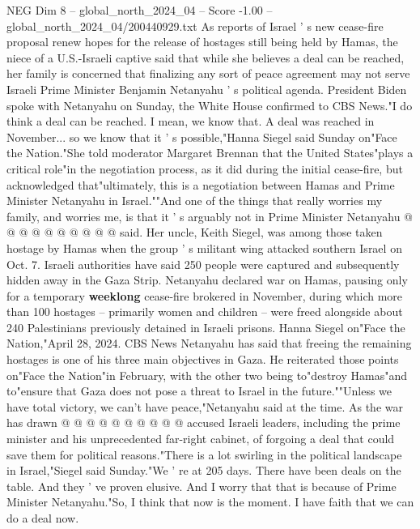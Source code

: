 \begin{textsample}{NEG Dim 8 – global\_north\_2024\_04 – Score -1.00 – global\_north\_2024\_04/200440929.txt}  \label{ex:f8_neg_134}
As reports of Israel ' s new cease-fire proposal renew hopes for the release of hostages still being held by Hamas, the niece of a U.S.-Israeli captive said that while she believes a deal can be reached, her family is concerned that finalizing any sort of peace agreement may not serve Israeli Prime Minister Benjamin Netanyahu ' s political agenda.
President Biden spoke with Netanyahu on Sunday, the White House confirmed to CBS News."I do think a deal can be reached.
I mean, we know that.
A deal was reached in November... so we know that it ' s possible,"Hanna Siegel said Sunday on"Face the Nation."She told moderator Margaret Brennan that the United States"plays a critical role"in the negotiation process, as it did during the initial cease-fire, but acknowledged that"ultimately, this is a negotiation between Hamas and Prime Minister Netanyahu in Israel.""And one of the things that really worries my family, and worries me, is that it ' s arguably not in Prime Minister Netanyahu @ @ @ @ @ @ @ @ @ @ said.
Her uncle, Keith Siegel, was among those taken hostage by Hamas when the group ' s militant wing attacked southern Israel on Oct. 7.
Israeli authorities have said 250 people were captured and subsequently hidden away in the Gaza Strip.
Netanyahu declared war on Hamas, pausing only for a temporary \textbf{weeklong} cease-fire brokered in November, during which more than 100 hostages -- primarily women and children -- were freed alongside about 240 Palestinians previously detained in Israeli prisons.
Hanna Siegel on"Face the Nation,"April 28, 2024.
CBS News Netanyahu has said that freeing the remaining hostages is one of his three main objectives in Gaza.
He reiterated those points on"Face the Nation"in February, with the other two being to"destroy Hamas"and to"ensure that Gaza does not pose a threat to Israel in the future.""Unless we have total victory, we can't have peace,"Netanyahu said at the time.
As the war has drawn @ @ @ @ @ @ @ @ @ @ accused Israeli leaders, including the prime minister and his unprecedented far-right cabinet, of forgoing a deal that could save them for political reasons."There is a lot swirling in the political landscape in Israel,"Siegel said Sunday."We ' re at 205 days.
There have been deals on the table.
And they ' ve proven elusive.
And I worry that that is because of Prime Minister Netanyahu."So, I think that now is the moment.
I have faith that we can do a deal now.

\end{textsample}
